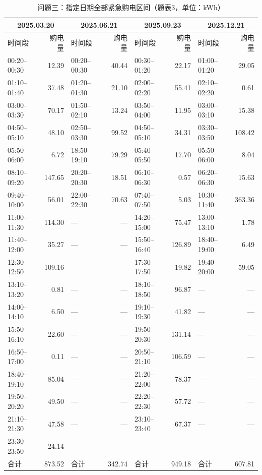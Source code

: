 \FloatBarrier
\begin{table}[H]
\centering\footnotesize
\setlength{\tabcolsep}{2.5pt}
\caption{问题三：指定日期全部紧急购电区间（题表3，单位：kWh）}
\label{tab:required-q3-emergency}
\begin{tabular}{@{}lrlrlrlr@{}}
\toprule
\multicolumn{2}{c}{2025.03.20} & \multicolumn{2}{c}{2025.06.21} & \multicolumn{2}{c}{2025.09.23} & \multicolumn{2}{c}{2025.12.21} \\
\midrule
时间段 & 购电量 & 时间段 & 购电量 & 时间段 & 购电量 & 时间段 & 购电量 \\
\midrule
00:20--00:30 & 12.39 & 00:20--00:30 & 40.44 & 00:30--01:20 & 22.17 & 01:00--01:20 & 29.05 \\
01:10--01:40 & 37.48 & 01:20--01:30 & 21.10 & 02:00--02:20 & 55.41 & 02:10--02:20 & 0.61 \\
03:00--03:30 & 70.17 & 01:50--02:10 & 13.24 & 03:50--04:00 & 11.95 & 03:00--03:10 & 15.38 \\
04:50--05:10 & 48.10 & 02:50--03:30 & 99.52 & 04:50--05:10 & 34.31 & 03:30--03:50 & 108.42 \\
05:50--06:00 & 6.72 & 18:50--19:10 & 79.29 & 05:40--05:50 & 17.70 & 05:50--06:00 & 8.04 \\
08:10--09:20 & 147.65 & 20:20--20:30 & 18.51 & 06:10--06:30 & 0.57 & 06:20--06:30 & 15.63 \\
09:40--10:00 & 56.01 & 22:00--22:30 & 70.63 & 07:40--07:50 & 5.03 & 10:30--11:40 & 363.36 \\
11:00--11:30 & 114.30 & — & — & 14:20--15:00 & 75.47 & 13:00--13:10 & 1.78 \\
11:40--12:00 & 35.27 & — & — & 15:50--16:40 & 126.89 & 18:40--19:00 & 6.49 \\
12:30--12:50 & 109.16 & — & — & 17:30--17:50 & 19.82 & 19:40--20:00 & 59.05 \\
13:10--13:20 & 0.81 & — & — & 18:10--18:50 & 96.87 & — & — \\
14:00--14:10 & 6.50 & — & — & 19:10--19:30 & 41.82 & — & — \\
15:50--16:10 & 22.60 & — & — & 19:50--20:30 & 131.14 & — & — \\
16:50--17:00 & 0.11 & — & — & 20:50--21:10 & 106.59 & — & — \\
18:40--19:10 & 85.04 & — & — & 21:20--22:00 & 78.37 & — & — \\
19:50--20:20 & 49.50 & — & — & 22:20--22:30 & 57.72 & — & — \\
21:10--21:30 & 47.58 & — & — & 23:10--23:40 & 67.37 & — & — \\
23:30--23:50 & 24.14 & — & — & — & — & — & — \\
合计 & 873.52 & 合计 & 342.74 & 合计 & 949.18 & 合计 & 607.81 \\
\bottomrule
\end{tabular}
\end{table}

